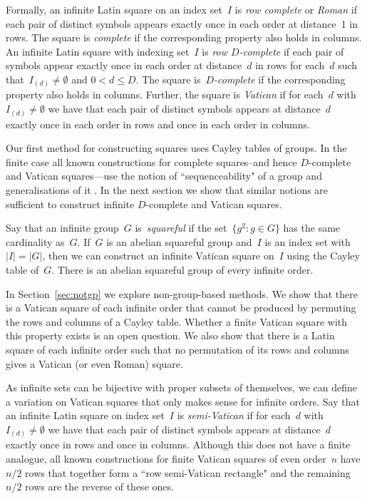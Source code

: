 \documentclass[12pt,a4paper]{article}
\begin{document}
Formally, an infinite Latin square on an index set~$I$  is {\em row complete} or {\em Roman} if each pair of distinct symbols appears exactly once in each order at distance~1 in rows.  The square is {\em complete} if the corresponding property also holds in columns.   An infinite Latin square with indexing set~$I$ is {\em row $D$-complete} if each pair of symbols appear exactly once in each order at distance~$d$ in rows for each~$d$ such that~$I_{(d)} \neq \emptyset$ and $0 < d \leq D$. The square is~{\em $D$-complete} if the corresponding property also holds in columns. Further, the square is {\em Vatican} if for each~$d$ with~$I_{(d)} \neq \emptyset$ we have that each pair of distinct symbols appears at distance~$d$ exactly once in each order in rows and once in each order in columns.



Our first method for constructing squares uses Cayley tables of groups.   In the finite case all known constructions for complete squares--and hence $D$-complete and Vatican squares---use the notion of ``sequenceability" of a group and generalisations of it \cite{TuscanCRC}.  In the next section we show that similar notions are sufficient to construct infinite $D$-complete and Vatican  squares.  

Say that an infinite group~$G$ is~{\em squareful} if the set~$\{ g^2 : g \in G\}$ has the same cardinality as~$G$.  If~$G$ is an abelian squareful group and~$I$ is an index set with~$|I| = |G|$, then we can construct an infinite Vatican square on~$I$ using the Cayley table of~$G$.   There is an abelian squareful group of every infinite order.

In Section~\ref{sec:notgp} we explore non-group-based methods.  We show that there is a Vatican square of each infinite order that cannot be produced by permuting the rows and columns of a Cayley table.  Whether a finite Vatican square with this property exists is an open question.  We also show that there is a Latin square of each infinite order such that no permutation of its rows and columns gives a Vatican (or even Roman) square.


As infinite sets can be bijective with proper subsets of themselves, we can define a variation on Vatican squares that only makes sense for infinite orders.
Say that an infinite Latin square on index set~$I$ is {\em semi-Vatican} if for each~$d$ with~$I_{(d)} \neq \emptyset$ we have that each pair of distinct symbols appears at distance~$d$ exactly once in rows and once in columns.  Although this does not have a finite analogue, all known constructions for finite Vatican squares of even order~$n$ have $n/2$ rows that together form a ``row semi-Vatican rectangle" and the remaining $n/2$ rows are the reverse of these ones.
\end{document}
